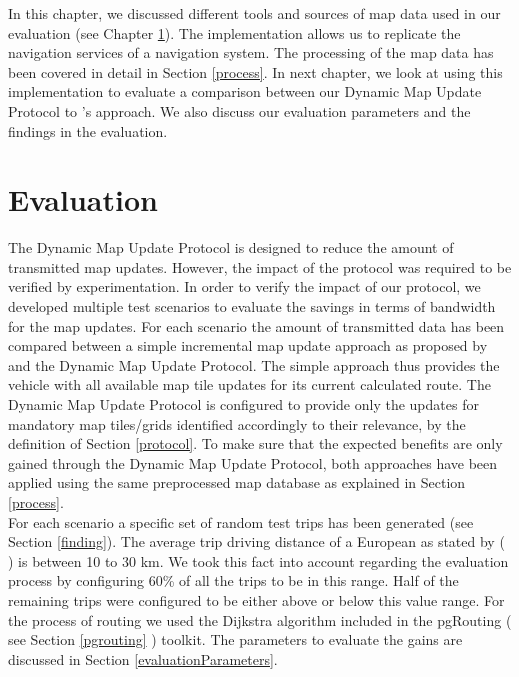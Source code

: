 In this chapter, we discussed different tools and sources of map data used in our evaluation (see Chapter \ref{ch:evaluation}). The implementation allows us to replicate the navigation services of a navigation system. The processing of the map data has been covered in detail in Section \ref{process}. In next chapter, we look at using this implementation to evaluate a comparison between our Dynamic Map Update Protocol to \citet{bastiaensen2003actmap}'s approach. We also discuss our evaluation parameters and the findings in the evaluation.



\chapter{Evaluation}\label{ch:evaluation}
The Dynamic Map Update Protocol is designed to reduce the amount of transmitted map updates. However, the impact of the protocol was required to be verified by experimentation. In order to verify the impact of our protocol, we developed multiple test scenarios to evaluate the savings in terms of bandwidth for the map updates. For each scenario the amount of transmitted data has been compared between a simple incremental map update approach as proposed by \citet{bastiaensen2003actmap} and the Dynamic Map Update Protocol. The simple approach thus provides the vehicle with all available map tile updates for its current calculated route. The Dynamic Map Update Protocol is configured to provide only the updates for mandatory map tiles/grids identified accordingly to their relevance, by the definition of Section \ref{protocol}. To make sure that the expected benefits are only gained through the Dynamic Map Update Protocol, both approaches have been applied using the same preprocessed map database as explained in Section \ref{process}. \\ 


For each scenario a specific set of random test trips has been generated (see Section \ref{finding}). The average trip driving distance of a European as stated by ( \citet{pasaoglu2012driving}) is between 10 to 30 km. We took this fact into account regarding the evaluation process by configuring 60\% of all the trips to be in this range. Half of the remaining trips were configured to be either above or below this value range. For the process of routing we used the Dijkstra algorithm included in the pgRouting ( see Section \ref{pgrouting} ) toolkit. The parameters to evaluate the gains are discussed in Section \ref{evaluationParameters}.


